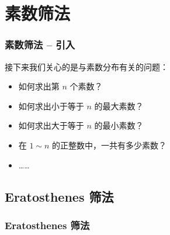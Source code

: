 \documentclass{../pkslide}
\begin{document}

\section{素数筛法}


\begin{frame}
  \frametitle{素数筛法 -- 引入}
  
  接下来我们关心的是与素数分布有关的问题：
  
  \begin{itemize}
    \item 如何求出第 $n$ 个素数？
    \item 如何求出小于等于 $n$ 的最大素数？
    \item 如何求出大于等于 $n$ 的最小素数？
    \item 在 $1 \sim n$ 的正整数中，一共有多少素数？
    \item ……
  \end{itemize}
  
\end{frame}


\subsection{Eratosthenes 筛法}
\subsubsection*{Eratosthenes 筛法}

\end{document}
